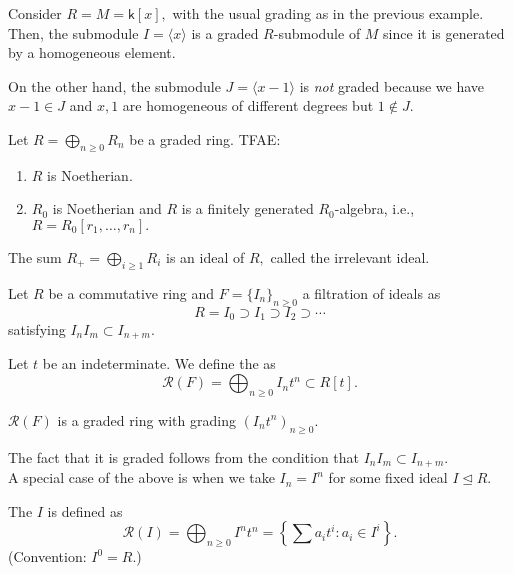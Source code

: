 \documentclass[12pt]{article}	%
\begin{document}
\begin{ex}
	Consider $R = M = \mathsf{k}[x],$ with the usual grading as in the previous example. Then, the submodule $I = \langle x\rangle$ is a graded $R$-submodule of $M$ since it is generated by a homogeneous element.

	On the other hand, the submodule $J = \langle x - 1\rangle$ is \emph{not} graded because we have $x - 1 \in J$ and $x, 1$ are homogeneous of different degrees but $1 \notin J.$
\end{ex}

\begin{thm}
	Let $R = \bigoplus_{n \ge 0} R_n$ be a graded ring. TFAE:
	\begin{enumerate}
		\item $R$ is Noetherian.
		\item $R_0$ is Noetherian and $R$ is a finitely generated $R_0$-algebra, i.e., $R = R_0[r_1, \ldots, r_n].$
	\end{enumerate}
\end{thm}

\begin{defn}%
	The sum $R_+ = \bigoplus_{i \ge 1} R_i$ is an ideal of $R,$ called the irrelevant ideal.
\end{defn}

\begin{defn}%
	Let $R$ be a commutative ring and $F = \{I_n\}_{n \ge 0}$ a filtration of ideals as
	\begin{equation*} 
		R = I_0 \supset I_1 \supset I_2 \supset \cdots
	\end{equation*}
	satisfying $I_n I_m \subset I_{n + m}.$

	Let $t$ be an indeterminate. We define the  as
	\begin{equation*} 
		\mathcal{R}(F) = \bigoplus_{n \ge 0} I_nt^n \subset R[t].
	\end{equation*}

	$\mathcal{R}(F)$ is a graded ring with grading $(I_nt^n)_{n \ge 0}.$
\end{defn}
The fact that it is graded follows from the condition that $I_nI_m \subset I_{n + m}.$\\
A special case of the above is when we take $I_n = I^n$ for some fixed ideal $I \unlhd R.$ 

\begin{defn}%
	The  $I$ is defined as
	\begin{equation*} 
		\mathcal{R}(I) = \bigoplus_{n \ge 0}I^nt^n = \left\{\sum a_it^i : a_i \in I^i\right\}.
	\end{equation*}
	(Convention: $I^0 = R.$)
\end{defn}
\end{document}
